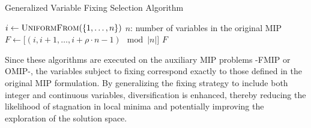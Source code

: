 \begin{algorithm}[H]
\caption{Generalized Variable Fixing Selection Algorithm}\label{alg:gen_variable_fixing}
\begin{algorithmic}[1]
    \State $i \gets \Call{UniformFrom}{\{1,\dots,n\}}$ \Comment $n$: number of variables in the original MIP 
    \State $F \gets \big[(i,i+1,\dots,i+\rho\cdot n -1) \mod |n|\big]$
    \State \Return $F$
\EndFunction
\end{algorithmic}
\end{algorithm}
Since these algorithms are executed on the auxiliary MIP problems -FMIP or OMIP-, the variables subject to fixing correspond exactly to those defined in the original MIP formulation.  
By generalizing the fixing strategy to include both integer and continuous variables, diversification is enhanced, thereby reducing the likelihood of stagnation in local minima and potentially improving the exploration of the solution space.


